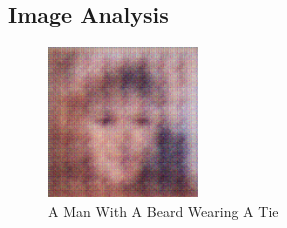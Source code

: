 \documentclass{article}%
\begin{document}
%
\subsection{Image Analysis}%
\label{subsec:ImageAnalysis}%


\begin{figure}[h!]%
\centering%
\includegraphics[width=150px]{500_fake_images/samples_5_416.png}%
\caption{A Man With A Beard Wearing A Tie}%
\end{figure}

%
\end{document}
